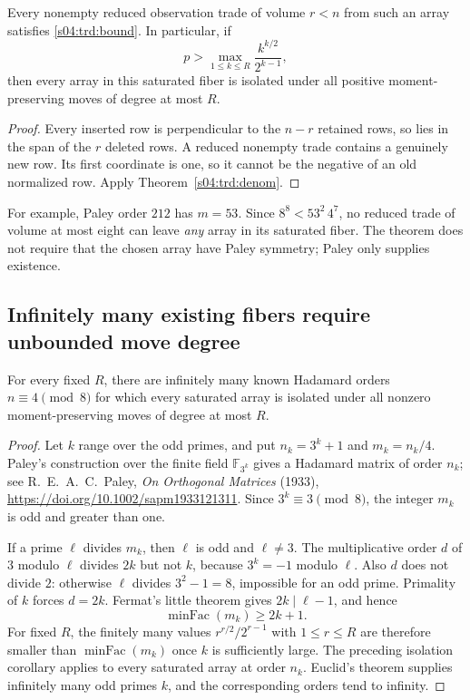 \begin{corollary}
Every nonempty reduced observation trade of volume $r<n$ from such an
array satisfies \eqref{s04:trd:bound}. In particular, if
\[
 p>\max_{1\le k\le R}\frac{k^{k/2}}{2^{k-1}},
\]
then every array in this saturated fiber is isolated under all positive
moment-preserving moves of degree at most $R$.
\end{corollary}
\begin{proof}
Every inserted row is perpendicular to the $n-r$ retained rows, so lies
in the span of the $r$ deleted rows. A reduced nonempty trade contains
a genuinely new row. Its first coordinate is one, so it cannot be the
negative of an old normalized row. Apply Theorem~\ref{s04:trd:denom}.
\end{proof}
For example, Paley order $212$ has $m=53$. Since
$8^8<53^2\,4^7$, no reduced trade of volume at most eight can leave
\emph{any} array in its saturated fiber. The theorem does not require
that the chosen array have Paley symmetry; Paley only supplies existence.

\subsection{Infinitely many existing fibers require unbounded move degree}
\begin{theorem}\label{s04:trd:unbounded}
For every fixed $R$, there are infinitely many known Hadamard orders
$n\equiv4\pmod8$ for which every saturated array is isolated under all
nonzero moment-preserving moves of degree at most $R$.
\end{theorem}
\begin{proof}
Let $k$ range over the odd primes, and put $n_k=3^k+1$ and
$m_k=n_k/4$. Paley's construction over the finite field
$\mathbb F_{3^k}$ gives a Hadamard matrix of order $n_k$;
see R.~E.~A.~C.~Paley, \emph{On Orthogonal Matrices} (1933),
\url{https://doi.org/10.1002/sapm1933121311}.
Since $3^k\equiv3\pmod8$, the integer $m_k$ is odd and greater than one.

If a prime $\ell$ divides $m_k$, then $\ell$ is odd and $\ell\ne3$.
The multiplicative order $d$ of $3$ modulo $\ell$ divides $2k$ but
not $k$, because $3^k=-1$ modulo $\ell$. Also $d$ does not divide $2$:
otherwise $\ell$ divides $3^2-1=8$, impossible for an odd prime.
Primality of $k$ forces $d=2k$. Fermat's little theorem gives
$2k\mid\ell-1$, and hence
\[
 \operatorname{minFac}(m_k)\ge2k+1.
\]
For fixed $R$, the finitely many values
$r^{r/2}/2^{r-1}$ with $1\le r\le R$ are therefore smaller than
$\operatorname{minFac}(m_k)$ once $k$ is sufficiently large.
The preceding isolation corollary applies to every saturated array at
order $n_k$. Euclid's theorem supplies infinitely many odd primes $k$,
and the corresponding orders tend to infinity.
\end{proof}

